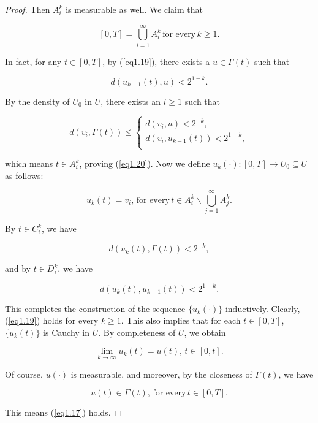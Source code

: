 \begin{proof}
Then $A^k_i$ is measurable as well. We claim that

\begin{equation}\label{eq1.20}
[0,T]=\bigcup^{\infty}_{i=1}A^k_i\,\mbox{for every}\,k\geq 1.
\end{equation}

In fact, for any $t\in[0,T]$, by (\ref{eq1.19}), there exists a $u\in\Gamma(t)$ such that 

$$d(u_{k-1}(t),u)<2^{1-k}.$$

By the density of $U_0$ in $U$, there exists an $i\geq 1$ such that

$$d(v_i,\Gamma(t))\leq\left\{ \begin{array}{l}
	d(v_i,u)< 2^{-k},  \\
	d(v_i,u_{k-1}(t))<2^{1-k},\\
\end{array}
\right.$$

which means $t\in A^k_i$, proving (\ref{eq1.20}). Now we define $u_k(\cdot):[0,T]\rightarrow U_0\subseteq U$ as follows:

$$u_k(t)=v_i,\,\mbox{for every}\, t\in A^k_{i}\backslash \bigcup^{\infty}_{j=1}A^k_j.$$

By $t\in C^k_i$, we have 

$$d(u_k(t),\Gamma(t))<2^{-k},$$

and by $t\in D^k_i$, we have

$$d(u_k(t),u_{k-1}(t))<2^{1-k}.$$

This completes the construction of the sequence $\{u_k(\cdot)\}$ inductively. Clearly, (\ref{eq1.19}) holds for every $k\geq 1$. This also implies that for each $t\in[0,T]$, $\{u_k(t)\}$ is Cauchy in $U$. By completeness of $U$, we obtain 

$$\lim_{k\rightarrow \infty} u_k(t)=u(t),\, t\in [0,t].$$

Of course, $u(\cdot)$ is measurable, and moreover, by the closeness of $\Gamma(t)$, we have

$$u(t)\in \Gamma(t),\,\mbox{for every}\, t\in [0,T].$$

This means (\ref{eq1.17}) holds.
\end{proof}

